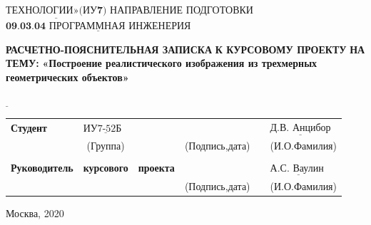 \documentclass[12pt,a4paper,oneside]{report}
\begin{document}
	$\underline{\textbf{ТЕХНОЛОГИИ»(ИУ7)}}$\newline\newline
	\noindent НАПРАВЛЕНИЕ ПОДГОТОВКИ $\underline{\textbf{09.03.04 ПРОГРАММНАЯ ИНЖЕНЕРИЯ}}$\newline\newline\newline\newline\newline\newline\newline
	\begin{center}
		\begin{flushright}
			\Large\textbf{РАСЧЕТНО-ПОЯСНИТЕЛЬНАЯ ЗАПИСКА}\newline
			\Large\textbf{К КУРСОВОМУ ПРОЕКТУ}\newline
			\Large\textbf{НА ТЕМУ:}\newline
			\Large\textbf{«Построение реалистического изображения из трехмерных геометрических объектов»}\newline
		\end{flushright}
	\end{center}
	\noindent\textbf{} $\underline{\text{}}$\newline\newline\newline\newline
	
	\begin{tabular}{lcp{5em}lp{2em}l}
		\noindent\textbf{Студент} &  $\underline{\text{ИУ7-52Б~~}}$ &             &\hspace{1cm} & & $\underline{\text{Д.В. Анцибор}}$ \\\cline{4-3}
		& (Группа) & &(Подпись,дата)  & & (И.О.Фамилия) \\
		& & & & &\\
		\noindent\textbf{Руководитель} & \textbf{курсового} &  \textbf{проекта}&\hspace{1cm} & &$\underline{\text{А.С. Ваулин~}}$ \\\cline{4-3} 
		&  & & (Подпись,дата)  & &(И.О.Фамилия) \\
	\end{tabular}
	
	\begin{center}
		\vfill
		Москва, 2020
	\end{center}
	\newpage
	
	\renewcommand*\contentsname{Содержание}
	\tableofcontents
	\setcounter{page}{1}
	\newpage
	
\end{document}

